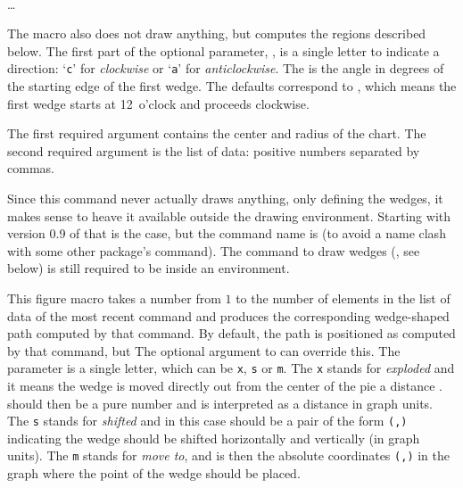 \documentclass[letterpaper]{article}
\begin{document}
\begin{cd}
%
    \\
\dots
{}%
\end{cd}

The macro  also does not draw anything, but computes the
 regions described below. The first part of the optional
parameter, , is a single letter to indicate a direction:
`\texttt{c}' for \emph{clockwise} or `\texttt{a}' for \emph{anticlockwise}.
The  is the angle in degrees of the starting edge of the
first wedge. The defaults correspond to , which means the
first wedge starts at 12~o'clock and proceeds clockwise.

The first required argument contains the center  and radius
 of the chart. The second required argument is the list of
data: positive numbers separated by commas.

Since this command never actually draws anything, only defining the
wedges, it makes sense to heave it available outside the drawing
environment. Starting with version 0.9 of \mfp{} that is the case, but
the command name is  (to avoid a name clash with some
other package's  command). The command to draw wedges
(, see below) is still required to be inside an 
environment.

\begin{cd}
%
%
\end{cd}

This figure macro takes a number from $1$ to the number of elements in
the list of data of the most recent  command and produces
the corresponding wedge-shaped path computed by that command. By
default, the path is positioned as computed by that 
command, but The optional argument to  can override this.
The parameter  is a single letter, which can be \texttt{x},
\texttt{s} or \texttt{m}. The \texttt{x} stands for \emph{exploded} and
it means the wedge is moved directly out from the center of the pie a
distance .  should then be a pure number and is
interpreted as a distance in graph units. The \texttt{s} stands for
\emph{shifted} and in this case  should be a pair of the
form \texttt{(,)} indicating the wedge should be
shifted  horizontally and  vertically (in graph
units). The \texttt{m} stands for \emph{move to}, and  is
then the absolute coordinates \texttt{(,)} in the graph
where the point of the wedge should be placed.
\end{document}
